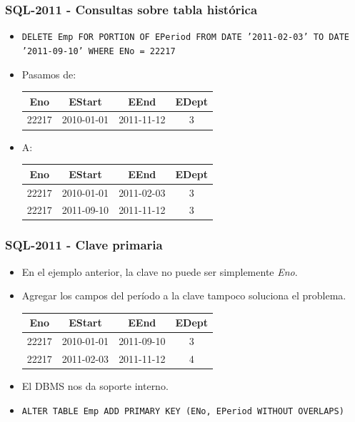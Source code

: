 \begin{frame}
\frametitle{SQL-2011 - Consultas sobre tabla histórica}
\begin{center}
\small
	\begin{itemize}

	\item	\texttt{DELETE Emp FOR PORTION OF EPeriod FROM DATE '2011-02-03'
		TO DATE '2011-09-10' WHERE ENo = 22217}

	\item Pasamos de: \hfill \begin{tabular}{|c|c|c|c|}
	\hline
	Eno	& EStart	& EEnd		& EDept	\\ \hline
	22217	& 2010-01-01	& 2011-11-12	& 3	\\ \hline
	\end{tabular}

	\item A: \hfill \begin{tabular}{|c|c|c|c|}
	\hline
	Eno	& EStart	& EEnd		& EDept	\\ \hline
	22217	& 2010-01-01	& 2011-02-03	& 3	\\ \hline
	22217	& 2011-09-10	& 2011-11-12	& 3	\\ \hline
	\end{tabular}

	\end{itemize}
\end{center}
\end{frame}

\begin{frame}
\frametitle{SQL-2011 - Clave primaria}
	\begin{itemize}
	\item	En el ejemplo anterior, la clave no puede ser simplemente
		{\it Eno}. \pause

	\item	Agregar los campos del período a la clave tampoco soluciona
		el problema. \pause

		\hfill \begin{tabular}{|c|c|c|c|}
		\hline
		Eno	& EStart	& EEnd		& EDept	\\ \hline
		22217	& 2010-01-01	& 2011-09-10	& 3	\\ \hline
		22217	& 2011-02-03	& 2011-11-12	& 4	\\ \hline
		\end{tabular}
		\pause

	\item	El DBMS nos da soporte interno.
	\pause

	\item	\texttt{ALTER TABLE Emp ADD PRIMARY KEY (ENo, EPeriod WITHOUT OVERLAPS)}
	\end{itemize}
\end{frame}

